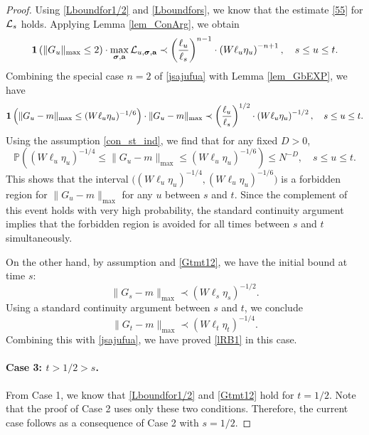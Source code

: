 \documentclass[10pt,reqno]{article}
\theoremstyle{plain} %
\theoremstyle{remark}
\numberwithin{equation}{section}
\begin{document}
\begin{proof}
Using \eqref{Lboundfor1/2} and \eqref{Lboundfors}, we know that the estimate \eqref{55} for \({\cal L}_s\) holds. Applying Lemma \ref{lem_ConArg}, we obtain
\begin{equation}\label{jsajufua}
    {\bf 1}\left(\|G_{u}\|_{\max} \leq 2\right) \cdot \max_{\boldsymbol{\sigma}, \textbf{a}} {\cal L}_{u, \boldsymbol{\sigma}, \textbf{a}} \prec \left( \frac{\ell_u}{\ell_s} \right)^{n-1} \cdot \left( W \ell_u \eta_u \right)^{-n+1}, \quad s \leq u \leq t.
\end{equation}
Combining the special case \(n = 2\) of \eqref{jsajufua} with Lemma \ref{lem_GbEXP}, we have
$$
{\bf 1}\left(\|G_u - m\|_{\max} \leq (W \ell_u \eta_u)^{-1/6}\right) \cdot \|G_u - m\|_{\max} \prec \left( \frac{\ell_u}{\ell_s} \right)^{1/2} \cdot \left( W \ell_u \eta_u \right)^{-1/2}, \quad s \leq u \leq t.
$$
Using the assumption \eqref{con_st_ind}, we find that for any fixed \(D > 0\),
\begin{equation}
    \mathbb{P}\left((W \ell_u \eta_u)^{-1/4} \leq \|G_u - m\|_{\max} \leq (W \ell_u \eta_u)^{-1/6}\right) \leq N^{-D}, \quad s \leq u \leq t.
\end{equation}
This shows that the interval \(\big((W \ell_u \eta_u)^{-1/4}, (W \ell_u \eta_u)^{-1/6}\big)\) is a forbidden region for \(\|G_u - m\|_{\max}\) for any \(u\) between \(s\) and \(t\). Since the complement of this event holds with very high probability, the standard continuity argument implies that the forbidden region is avoided for all times between \(s\) and \(t\) simultaneously.

On the other hand, by assumption and \eqref{Gtmt12}, we have the initial bound at time \(s\):
$$
\|G_s - m\|_{\max} \prec (W \ell_s \eta_s)^{-1/2}.
$$
Using a standard continuity argument between \(s\) and \(t\), we conclude
$$
\|G_t - m\|_{\max} \prec (W \ell_t \eta_t)^{-1/4}.
$$
Combining this with \eqref{jsajufua}, we have proved \eqref{lRB1} in this case.

\paragraph{Case 3: \(t > 1/2 > s\).} From Case 1, we know that \eqref{Lboundfor1/2} and \eqref{Gtmt12} hold for \(t = 1/2\). Note that the proof of Case 2 uses only these two conditions. Therefore, the current case follows as a consequence of Case 2 with \(s = 1/2\).

\end{proof}
\end{document}
